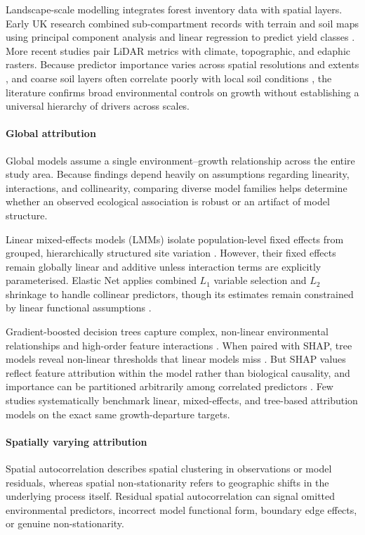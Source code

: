 Landscape-scale modelling integrates forest inventory data with spatial layers. Early UK research combined sub-compartment records with terrain and soil maps using principal component analysis and linear regression to predict yield classes \cite{bateman1998Using_C1_SS}. More recent studies pair LiDAR metrics with climate, topographic, and edaphic rasters. Because predictor importance varies across spatial resolutions and extents \cite{fricker2019More_C3_LID}, and coarse soil layers often correlate poorly with local soil conditions \cite{miller2024Assessing_C2_CR}, the literature confirms broad environmental controls on growth without establishing a universal hierarchy of drivers across scales.

\paragraph*{Global attribution}
Global models assume a single environment--growth relationship across the entire study area. Because findings depend heavily on assumptions regarding linearity, interactions, and collinearity, comparing diverse model families helps determine whether an observed ecological association is robust or an artifact of model structure.

Linear mixed-effects models (LMMs) isolate population-level fixed effects from grouped, hierarchically structured site variation \cite{harrison2018Brief_LMM, socha2016Assessment_C2_CR}. However, their fixed effects remain globally linear and additive unless interaction terms are explicitly parameterised. Elastic Net applies combined $L_1$ variable selection and $L_2$ shrinkage to handle collinear predictors, though its estimates remain constrained by linear functional assumptions \cite{zou2005Regularization_C4_NN}.

Gradient-boosted decision trees capture complex, non-linear environmental relationships and high-order feature interactions \cite{puliti2023Tree_C2_CR, chen2016XGBoost_C4_NN}. When paired with SHAP, tree models reveal non-linear thresholds that linear models miss \cite{lundberg2017Unified_C7_XAI}. But SHAP values reflect feature attribution within the model rather than biological causality, and importance can be partitioned arbitrarily among correlated predictors \cite{aas2021Explaining_C7_XAI}. Few studies systematically benchmark linear, mixed-effects, and tree-based attribution models on the exact same growth-departure targets.

\paragraph*{Spatially varying attribution}
Spatial autocorrelation describes spatial clustering in observations or model residuals, whereas spatial non-stationarity refers to geographic shifts in the underlying process itself. Residual spatial autocorrelation can signal omitted environmental predictors, incorrect model functional form, boundary edge effects, or genuine non-stationarity. 

